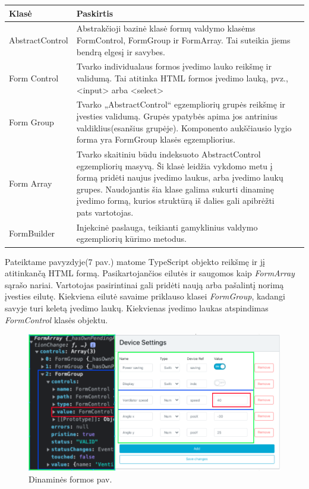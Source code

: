 \documentclass{VUMIFInfBakalaurinis}
\begin{document}
\begin{tabular}{  l  p{10cm}  p{15cm} }

\toprule
\textbf{Klasė}
& \textbf{Paskirtis} \\
\midrule

AbstractControl
& Abstrakčioji bazinė klasė formų valdymo klasėms FormControl, FormGroup ir FormArray. Tai suteikia jiems bendrą elgesį ir savybes. \\

\hline
Form Control     
& Tvarko individualaus formos įvedimo lauko reikšmę ir validumą. Tai atitinka HTML formos įvedimo lauką, pvz., <input> arba <select> \\

\hline
Form Group
& Tvarko „AbstractControl“ egzempliorių grupės reikšmę ir įvesties validumą. Grupės ypatybės apima jos antrinius valdiklius(esanšius grupėje). Komponento aukščiausio lygio forma yra FormGroup klasės egzempliorius. \\

\hline
Form Array
& Tvarko skaitiniu būdu indeksuoto AbstractControl egzempliorių masyvą. Ši klasė leidžia vykdomo metu į formą pridėti naujus įvedimo laukus, arba įvedimo laukų grupes.
Naudojantis šia klase galima sukurti dinaminę įvedimo formą, kurios struktūrą iš dalies gali apibrėžti pats vartotojas.\\

\hline
FormBuilder
& Injekcinė paslauga, teikianti gamyklinius valdymo egzempliorių kūrimo metodus. \\

\bottomrule
\end{tabular}

Pateiktame pavyzdyje(7 pav.) matome TypeScript objekto reikšmę ir jį atitinkančą HTML formą. Pasikartojančios eilutės ir saugomos kaip \emph{FormArray} sąrašo nariai.
Vartotojas pasirintinai gali pridėti naują arba pašalintį norimą įvesties eilutę. Kiekviena eilutė savaime priklauso klasei \emph{FormGroup}, kadangi savyje turi keletą įvedimo laukų. 
Kiekvienas įvedimo laukas atspindimas \emph{FormControl} klasės objektu.

\begin{figure}[H]
    \centering
    \includegraphics[scale=0.5]{img/reactive-form-example}
    \caption{Dinaminės formos pav.}   %
    \label{img:mlp}
\end{figure}
\end{document}
